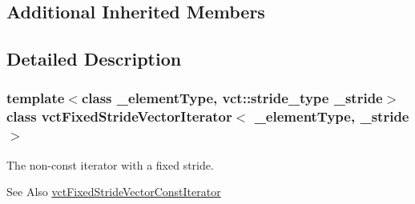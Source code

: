 \subsection*{Additional Inherited Members}


\subsection{Detailed Description}
\subsubsection*{template$<$class \-\_\-element\-Type, vct\-::stride\-\_\-type \-\_\-stride$>$class vct\-Fixed\-Stride\-Vector\-Iterator$<$ \-\_\-element\-Type, \-\_\-stride $>$}

The non-\/const iterator with a fixed stride. \begin{DoxySeeAlso}{See Also}
\hyperlink{classvct_fixed_stride_vector_const_iterator}{vct\-Fixed\-Stride\-Vector\-Const\-Iterator} 
\end{DoxySeeAlso}


